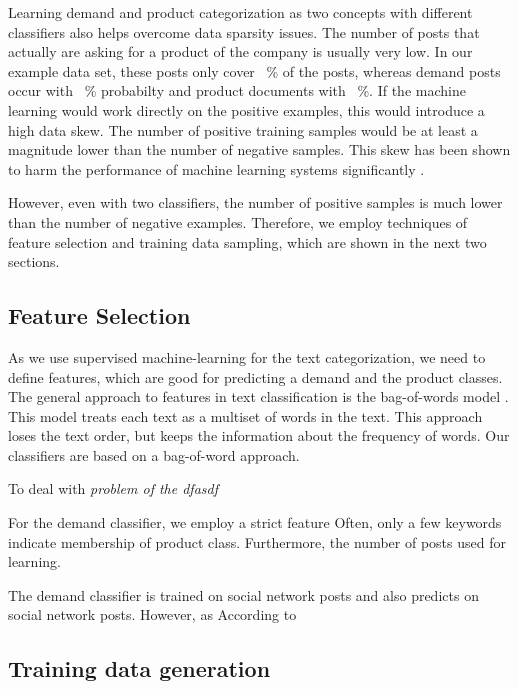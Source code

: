 Learning demand and product categorization as two concepts with different classifiers also helps overcome data sparsity issues.
The number of posts that actually are asking for a product of the company is usually very low.
In our example data set, these posts only cover ~\% of the posts, whereas demand posts occur with ~\% probabilty and product documents with ~\%.
If the machine learning would work directly on the positive examples, this would introduce a high data skew.
The number of positive training samples would be at least a magnitude lower than the number of negative samples.
This skew has been shown to harm the performance of machine learning systems significantly \cite{monard2002learning,guo2008class}.

However, even with two classifiers, the number of positive samples is much lower than the number of negative examples.
Therefore, we employ techniques of feature selection and training data sampling, which are shown in the next two sections.

\subsection{Feature Selection}
As we use supervised machine-learning for the text categorization, we need to define features, which are good for predicting a demand and the product classes.
The general approach to features in text classification is the bag-of-words model \cite{yang1997comparative,zhang2010understanding}.
This model treats each text as a multiset of words in the text.
This approach loses the text order, but keeps the information about the frequency of words.
Our classifiers are based on a bag-of-word approach.

To deal with \emph{problem of the dfasdf}


For the demand classifier, we employ a strict feature
Often, only a few keywords indicate membership of product class.
Furthermore, the number of posts used for learning.


The demand classifier is trained on social network posts and also predicts on social network posts.
However, as
According to


\subsection{Training data generation}



